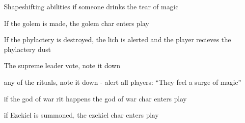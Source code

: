 \documentclass[green]{guildcamp2}
\begin{document}
\name{\gGMInstructions{}}

\begin{enum}
	\item Shapeshifting abilities if someone drinks the tear of magic
	\item If the golem is made, the golem char enters play
	\item If the phylactery is destroyed, the lich is alerted and the player recieves the phylactery dust
	\item The supreme leader vote, note it down
	\item any of the rituals, note it down - alert all players: "`They feel a surge of magic"'
	\item if the god of war rit happens the god of war char enters play
	\item if Ezekiel is summoned, the ezekiel char enters play
\end{enum}
	
\end{document}
